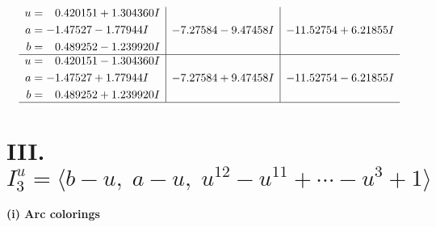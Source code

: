 \documentclass[1p]{elsarticle_modified}
\theoremstyle{definition}
\begin{document}
$$\begin{array}{c|c|c}
\begin{aligned}
u &= \phantom{-}0.420151 + 1.304360 I \\
a &= -1.47527 - 1.77944 I \\
b &= \phantom{-}0.489252 - 1.239920 I\end{aligned}
 & -7.27584 - 9.47458 I & -11.52754 + 6.21855 I \\ \hline\begin{aligned}
u &= \phantom{-}0.420151 - 1.304360 I \\
a &= -1.47527 + 1.77944 I \\
b &= \phantom{-}0.489252 + 1.239920 I\end{aligned}
 & -7.27584 + 9.47458 I & -11.52754 - 6.21855 I\\
 \hline 
 \end{array}$$\newpage\newpage\renewcommand{\arraystretch}{1}
\centering \section*{III. $I^u_{3}= \langle b- u,\;a- u,\;u^{12}- u^{11}+\cdots- u^3+1 \rangle$}
\flushleft \textbf{(i) Arc colorings}\\
\end{document}
